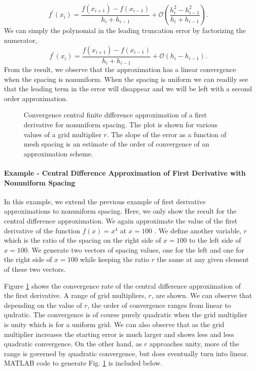\begin{equation}
     f^{\prime}\left(x_{i}\right) = \frac{f\left(x_{i+1}\right) -  f\left(x_{i-1}\right)}{h_{i} + h_{i-1}} +  
     \mathcal{O}\left(\frac{h^{2}_{i} - h^{2}_{i-1}}{h_{i} + h_{i-1}}\right).
\end{equation}
We can simply the polynomial in the leading truncation error by factorizing the numerator,
\begin{equation}
     \boxed{f^{\prime}\left(x_{i}\right) = \frac{f\left(x_{i+1}\right) -  f\left(x_{i-1}\right)}{h_{i} + h_{i-1}} +  
     \mathcal{O}\left(h_{i} - h_{i-1}\right).}
  \label{eq:fdm_non_central1}
\end{equation}
From the result, we observe that the approximation has a linear convergence when the spacing is nonuniform.  When
the spacing is uniform we can readily see that the leading term in the error will disappear and we will be left with a
second order approximation.

\begin{figure}[t]
\sidecaption[t]
\scalebox{0.5}{}
\caption{Convergence central finite difference approximation of  a first derivative for nonuniform spacing. The plot is shown for various values of a grid multiplier $r$. The slope of the error as a function of mesh spacing is an estimate of the order of convergence of an approximation scheme.}
\label{fig:fdm_nonuni_1}
\end{figure}

\paragraph{Example - Central Difference Approximation of First Derivative with Nonuniform Spacing}
In this example, we extend the previous example of first derivative approximations to nonuniform spacing. Here, we
only show the result for the central difference approximation.  We again approximate the value of the first derivative of
the function  $f\left(x\right) = x^{4}$ at $x=100$ .  We define another variable, $r$ which is the ratio of the spacing on
the right side of $x=100$ to the left side of $x=100$.  We generate two vectors of spacing values, one for the left and one
for the right side of $x=100$ while keeping the ratio $r$ the same at any given element of these two vectors.
\par
Figure \ref{fig:fdm_nonuni_1} shows the convergence rate of the central difference approximation of the first derivative. A range of grid multipliers, $r$, are shown.  We can observe that depending on the value of $r$, the order of convergence 
ranges from linear to qudratic.  The convergence is of course purely quadratic when the grid multiplier is unity which is for a
uniform grid. We can also observe that as the grid multiplier increases the starting error is much larger and shows less and 
less quadratic convergence.  On the other hand, as $r$ approaches unity, more of the range is governed by quadratic
convergence, but does eventually turn into linear. MATLAB code to generate Fig. \ref{fig:fdm_nonuni_1} is included below.


